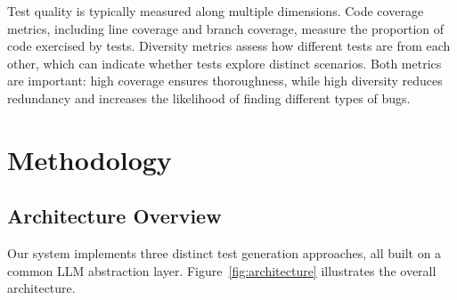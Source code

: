 \documentclass[11pt]{article}
\begin{document}
Test quality is typically measured along multiple dimensions. Code coverage metrics, including line coverage and branch coverage, measure the proportion of code exercised by tests. Diversity metrics assess how different tests are from each other, which can indicate whether tests explore distinct scenarios. Both metrics are important: high coverage ensures thoroughness, while high diversity reduces redundancy and increases the likelihood of finding different types of bugs.

\section{Methodology}

\subsection{Architecture Overview}

Our system implements three distinct test generation approaches, all built on a common LLM abstraction layer. Figure~\ref{fig:architecture} illustrates the overall architecture.
\end{document}
